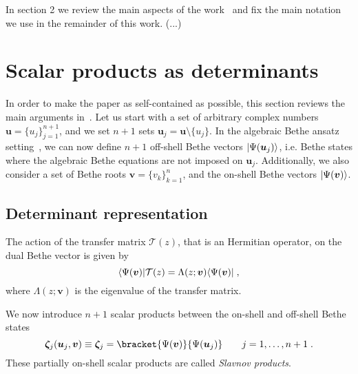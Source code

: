 \documentclass[a4paper,12pt]{amsart}
\begin{document}
In section 2 we review the main aspects of the
work~\cite{Belliard:2019bfz} and fix the main notation we use in the
remainder of this work. (...)






\section{Scalar products as determinants}

In order to make the paper as self-contained as possible, this section
reviews the main arguments in~\cite{Belliard:2019bfz}. Let us start
with a set of arbitrary complex numbers \(\bm{u} =
\{u_j\}_{j=1}^{n+1}\), and we set \(n+1\) sets
\(\bm{u}_j=\bm{u}\setminus \{u_j\}\). In the algebraic Bethe ansatz
setting~\cite{Korepin:1993kvr}, we can now define \(n+1\) off-shell
Bethe vectors \(\lvert\Psi(\bm{u}_j)\rangle\), i.e. Bethe states where the
algebraic Bethe equations are not imposed on
\(\bm{u}_j\). Additionally, we also consider a set of Bethe roots
\(\bm{v} = \{ v_k \}_{k=1}^n\), and the on-shell Bethe vectors
\(\lvert\Psi(\bm{v})\rangle\).


\subsection{Determinant representation}
The action of the transfer matrix \(\mathcal{T}(z)\), that is an
Hermitian operator, on the dual Bethe vector is given by
\begin{equation}
\label{eq:eigenvalue-bethe}
\langle\Psi(\bm{v})\rvert\mathcal{T}(z) = \Lambda(z; \bm{v}) \langle\Psi(\bm{v})\rvert \; , 
\end{equation}
where \(\Lambda(z; \bm{v}) \) is the eigenvalue of the transfer matrix. 

We now introduce \(n+1\) scalar products between the on-shell and
off-shell Bethe states
\begin{equation}
  \bm{\zeta}_j(\bm{u}_j, \bm{v}) \equiv  \bm{\zeta}_j
  = \bracket{\Psi(\bm{v})}{\Psi(\bm{u}_j)}\qquad j =1, \dots, n+1\; .
\end{equation}
These partially on-shell scalar products are called \emph{Slavnov
products}.
\end{document}
